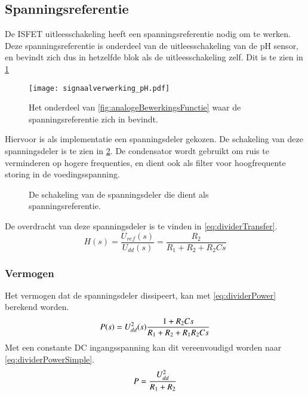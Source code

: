 \subsection{Spanningsreferentie}\label{sec:referenceVoltage}
De ISFET uitleesschakeling heeft een spanningsreferentie nodig om te werken. Deze spanningsreferentie is onderdeel van de uitleesschakeling van de pH sensor, en bevindt zich dus in hetzelfde blok als de uitleesschakeling zelf. Dit is te zien in \cref{fig:referenceInSchema}
\begin{figure}[!htbp]
    \centering
    \texttt{[image: signaalverwerking\_pH.pdf]}
    \caption{Het onderdeel van \cref{fig:analogeBewerkingsFunctie} waar de spanningsreferentie zich in bevindt.}
    \label{fig:referenceInSchema}
\end{figure}

Hiervoor is als implementatie een spanningsdeler gekozen. De schakeling van deze spanningsdeler is te zien in \cref{fig:divider}.
De condensator wordt gebruikt om ruis te verminderen op hogere frequenties, en dient ook als filter voor hoogfrequente storing in de voedingsspanning.

\begin{figure}[!htbp]
    \centering
    \def\svgwidth{0.5\textwidth}
    
    \caption{De schakeling van de spanningsdeler die dient als spanningsreferentie.}
    \label{fig:divider}
\end{figure}

De overdracht van deze spanningsdeler is te vinden in \cref{eq:dividerTransfer}.
\begin{equation}\label{eq:dividerTransfer}
    H(s) = \frac{U_{ref}(s)}{U_{dd}(s)} = \frac{R_2}{R_1 + R_2 + R_2Cs}
\end{equation}

\subsubsection{Vermogen}
Het vermogen dat de spanningsdeler dissipeert, kan met \cref{eq:dividerPower} berekend worden.
\begin{equation}\label{eq:dividerPower}
    P(s) = U_{dd}^2(s)\frac{1+R_2Cs}{R_1 + R_2 + R_1R_2Cs}
    \tagaddtext{[\si{\watt}]}
\end{equation}
Met een constante DC ingangsspanning kan dit vereenvoudigd worden naar \cref{eq:dividerPowerSimple}.
\begin{equation}\label{eq:dividerPowerSimple}
    P = \frac{U_{dd}^2}{R_1 + R_2}
    \tagaddtext{[\si{\watt}]}
\end{equation}

